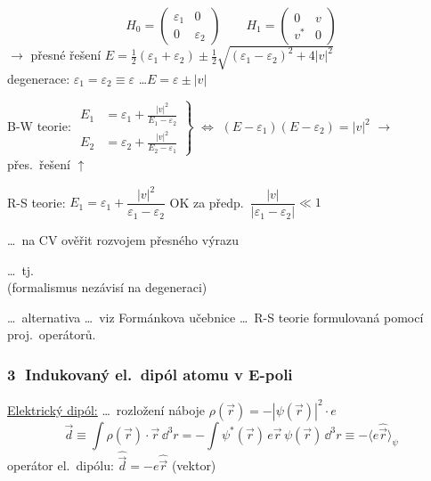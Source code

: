 \begin{priklad}
\[
  H_0 = \begin{pmatrix}\varepsilon_1 & 0\\ 0 & \varepsilon_2\end{pmatrix} \qquad
  H_1 = \begin{pmatrix}0 & v\\ v^* & 0\end{pmatrix}
\]
$\to$ přesné řešení \quad $E = \frac12(\varepsilon_1 + \varepsilon_2) \pm \frac12\sqrt{(\varepsilon_1 - \varepsilon_2)^2 + 4|v|^2}$ \\
\quad degenerace: $\varepsilon_1 = \varepsilon_2 \equiv \varepsilon$ \quad \dots \quad $E = \varepsilon \pm |v|$

B-W teorie: \quad
$\left.\begin{aligned}
  E_1 &= \varepsilon_1 + \frac{|v|^2}{E_1 - \varepsilon_2} \\
  E_2 &= \varepsilon_2 + \frac{|v|^2}{E_2 - \varepsilon_1}
\end{aligned}\right\}$
\quad $\Longleftrightarrow$ \quad $(E - \varepsilon_1)(E - \varepsilon_2) = |v|^2$ \quad $\to$ přes.\ řešení $\uparrow$

R-S teorie: \quad $E_1 = \varepsilon_1 + \dfrac{|v|^2}{\varepsilon_1 - \varepsilon_2}$ \qquad OK za předp.\ $\dfrac{|v|}{|\varepsilon_1 - \varepsilon_2|} \ll 1$

\dots\ na CV ověřit rozvojem přesného výrazu
\end{priklad}

\dots\ tj.\  \\
\quad (formalismus nezávisí na degeneraci)

\dots\ alternativa \dots\ viz Formánkova učebnice \dots\ R-S teorie formulovaná pomocí proj.\ operátorů.

\subsubsection*{\textcircled{3} Indukovaný el.\ dipól atomu v E-poli}

\underline{Elektrický dipól:} \dots\ rozložení náboje \quad $\rho(\vec r) = -|\psi(\vec r)|^2\cdot e$
\[
  \vec d \equiv \int\rho(\vec r)\cdot\vec r\,\dd^3r = -\int\psi^*(\vec r)\,e\vec r\,\psi(\vec r)\,\dd^3r \equiv -\langle e\hat{\vec r}\rangle_\psi
\]
\quad operátor el.\ dipólu: \quad $\hat{\vec d} = -e\hat{\vec r}$ \quad (vektor)

